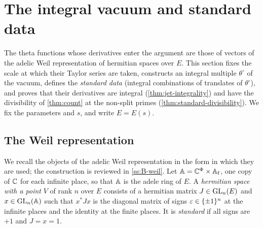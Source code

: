 \section{The integral vacuum and standard data}\label{sec:vacuum}

The theta functions whose derivatives enter the argument are those of vectors of the adelic Weil
representation of hermitian spaces over $E$. This section fixes the scale at which their Taylor
series are taken, constructs an integral multiple $\theta^\circ$ of the vacuum, defines the
\emph{standard data} (integral combinations of translates of $\theta^\circ$), and proves that their
derivatives are integral (\cref{thm:jet-integrality}) and have the divisibility of
\cref{thm:count} at the non-split primes (\cref{thm:standard-divisibility}). We fix the parameters and
$s$, and write $E=E(s)$.

\subsection{The Weil representation}\label{ss:weil-rep}
We recall the objects of the adelic Weil representation in the form in which they are used; the
construction is reviewed in \cref{ss:B-weil}. Let $\mathbb{A}=\mathbb{C}^\Phi\times\mathbb{A}_{\mathrm f}$, one copy of $\mathbb{C}$
for each infinite place, so that $\mathbb{A}$ is the adele ring of $E$. A \emph{hermitian space with a
point} $V$ of rank $n$ over $E$ consists of a hermitian matrix $J\in\operatorname{GL}_n(E)$ and $x\in\operatorname{GL}_n(\mathbb{A})$ such
that $x^*Jx$ is the diagonal matrix of signs $\varepsilon\in\{\pm1\}^n$ at the infinite places and the identity
at the finite places. It is \emph{standard} if all signs are $+1$ and $J=x=1$.

